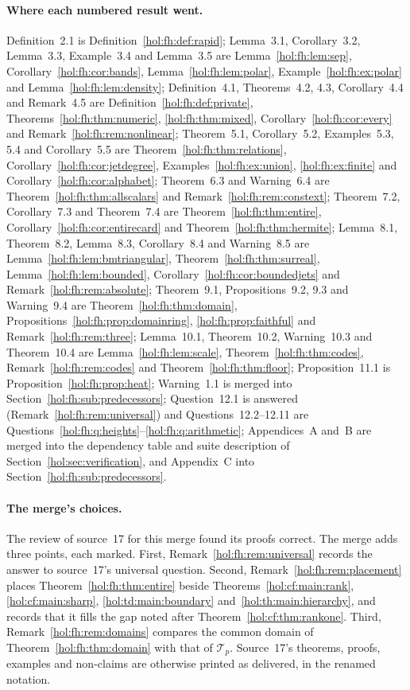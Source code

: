 \documentclass[11pt]{article}
\numberwithin{equation}{section}
\theoremstyle{definition}
\theoremstyle{remark}
\begin{document}
\paragraph{Where each numbered result went.}
Definition~2.1 is Definition~\ref{hol:fh:def:rapid}; Lemma~3.1,
Corollary~3.2, Lemma~3.3, Example~3.4 and Lemma~3.5 are
Lemma~\ref{hol:fh:lem:sep}, Corollary~\ref{hol:fh:cor:bands},
Lemma~\ref{hol:fh:lem:polar}, Example~\ref{hol:fh:ex:polar} and
Lemma~\ref{hol:fh:lem:density}; Definition~4.1, Theorems~4.2, 4.3,
Corollary~4.4 and Remark~4.5 are Definition~\ref{hol:fh:def:private},
Theorems~\ref{hol:fh:thm:numeric}, \ref{hol:fh:thm:mixed},
Corollary~\ref{hol:fh:cor:every} and Remark~\ref{hol:fh:rem:nonlinear};
Theorem~5.1, Corollary~5.2, Examples~5.3, 5.4 and Corollary~5.5 are
Theorem~\ref{hol:fh:thm:relations}, Corollary~\ref{hol:fh:cor:jetdegree},
Examples~\ref{hol:fh:ex:union}, \ref{hol:fh:ex:finite} and
Corollary~\ref{hol:fh:cor:alphabet}; Theorem~6.3 and Warning~6.4 are
Theorem~\ref{hol:fh:thm:allscalars} and Remark~\ref{hol:fh:rem:constext};
Theorem~7.2, Corollary~7.3 and Theorem~7.4 are
Theorem~\ref{hol:fh:thm:entire}, Corollary~\ref{hol:fh:cor:entirecard} and
Theorem~\ref{hol:fh:thm:hermite}; Lemma~8.1, Theorem~8.2, Lemma~8.3,
Corollary~8.4 and Warning~8.5 are Lemma~\ref{hol:fh:lem:bmtriangular},
Theorem~\ref{hol:fh:thm:surreal}, Lemma~\ref{hol:fh:lem:bounded},
Corollary~\ref{hol:fh:cor:boundedjets} and Remark~\ref{hol:fh:rem:absolute};
Theorem~9.1, Propositions~9.2, 9.3 and Warning~9.4 are
Theorem~\ref{hol:fh:thm:domain}, Propositions~\ref{hol:fh:prop:domainring},
\ref{hol:fh:prop:faithful} and Remark~\ref{hol:fh:rem:three}; Lemma~10.1,
Theorem~10.2, Warning~10.3 and Theorem~10.4 are Lemma~\ref{hol:fh:lem:scale},
Theorem~\ref{hol:fh:thm:codes}, Remark~\ref{hol:fh:rem:codes} and
Theorem~\ref{hol:fh:thm:floor}; Proposition~11.1 is
Proposition~\ref{hol:fh:prop:heat}; Warning~1.1 is merged into
Section~\ref{hol:fh:sub:predecessors}; Question~12.1 is answered
(Remark~\ref{hol:fh:rem:universal}) and Questions~12.2--12.11 are
Questions~\ref{hol:fh:q:heights}--\ref{hol:fh:q:arithmetic}; Appendices~A
and~B are merged into the dependency table and suite description of
Section~\ref{hol:sec:verification}, and Appendix~C into
Section~\ref{hol:fh:sub:predecessors}.

\paragraph{The merge's choices.}
The review of source~17 for this merge found its proofs correct. The merge
adds three points, each marked. First, Remark~\ref{hol:fh:rem:universal}
records the answer to source~17's universal question. Second,
Remark~\ref{hol:fh:rem:placement} places Theorem~\ref{hol:fh:thm:entire}
beside Theorems~\ref{hol:cf:main:rank}, \ref{hol:cf:main:sharp},
\ref{hol:td:main:boundary} and~\ref{hol:th:main:hierarchy}, and records that it
fills the gap noted after Theorem~\ref{hol:cf:thm:rankone}. Third,
Remark~\ref{hol:fh:rem:domains} compares the common domain of
Theorem~\ref{hol:fh:thm:domain} with that of $\mathcal T_p$. Source~17's
theorems, proofs, examples and non-claims are otherwise printed as delivered,
in the renamed notation.
\end{document}
